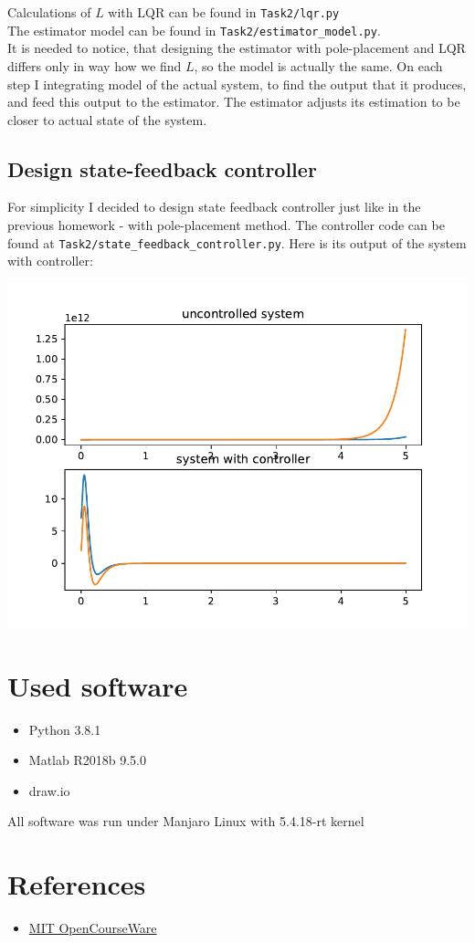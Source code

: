 \documentclass[a4paper,12pt]{article}
\begin{document}
Calculations of $L$ with LQR can be found in \texttt{Task2/lqr.py}\\
The estimator model can be found in \texttt{Task2/estimator\_model.py}.\\
It is needed to notice, that designing the estimator with pole-placement and LQR
differs only in way how we find $L$, so the model is actually the same. On each 
step I integrating model of the actual system, to find the output that it produces, 
and feed this output to the estimator. The estimator adjusts its estimation to
be closer to actual state of the system.
\subsection{Design state-feedback controller}
For simplicity I decided to design state feedback controller just like in the 
previous homework - with pole-placement method. The controller code can be found 
at \texttt{Task2/state\_feedback\_controller.py}.
Here is its output of the system with controller:
\begin{center}
    \includegraphics[width=\linewidth]{../Task2/out.pdf}
\end{center}

\section{Used software}
\begin{itemize}
    \item Python 3.8.1
    \item Matlab R2018b 9.5.0
    \item draw.io
\end{itemize}
All software was run under Manjaro Linux with 5.4.18-rt kernel
\section{References}
\begin{itemize}
    \item \href{https://ocw.mit.edu/courses/aeronautics-and-astronautics/16-30-feedback-control-systems-fall-2010/lecture-notes/MIT16_30F10_lec14.pdf}
    {MIT OpenCourseWare}
\end{itemize}
\end{document}

